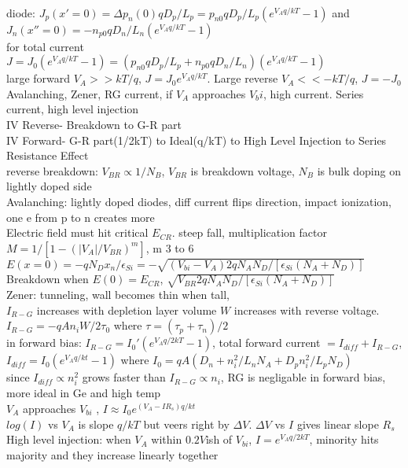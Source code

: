 \documentclass{article}
\begin{document}
\\diode: $J_p(x'=0)=\Delta p_n(0) q D_p/L_p=p_{n0} q D_p/L_p (e^{V_A q/kT}-1)$ and $J_n(x''=0)=-n_{p0} q D_n/L_n (e^{V_A q/kT}-1)$
\\for total current $J=J_0 (e^{V_A q/kT}-1) = (p_{n0} q D_p/L_p+n_{p0} q D_n/L_n)(e^{V_A q/kT}-1)$
\\large forward $V_A>>kT/q$, $J=J_0 e^{V_A q/kT}$. Large reverse $V_A<<-kT/q$, $J=-J_0$
\\Avalanching, Zener, RG current, if $V_A$ approaches $V_bi$, high current. Series current, high level injection
\\IV Reverse- Breakdown to G-R part
\\IV Forward- G-R part(1/2kT) to Ideal(q/kT) to High Level Injection to Series Resistance Effect
\\reverse breakdown: $V_{BR}\propto 1/N_B$, $V_{BR}$ is breakdown voltage, $N_B$ is bulk doping on lightly doped side
\\Avalanching: lightly doped diodes, diff current flips direction, impact ionization, one e from p to n creates more
\\Electric field must hit critical $E_{CR}$. steep fall, multiplication factor $M=1/[1-(|V_A|/V_{BR})^m]$, m 3 to 6
\\$E(x=0)=-q N_D x_n/\epsilon_{Si}=-\sqrt{(V_{bi}-V_A) 2q N_AN_D/[\epsilon_{Si}(N_A+N_D)]}$
\\Breakdown when $E(0)=E_{CR}$, $\sqrt{V_{BR} 2q N_AN_D/[\epsilon_{Si}(N_A+N_D)]}$
\\Zener: tunneling, wall becomes thin when tall, 
\\$I_{R-G}$ increases with depletion layer volume $W$ increases with reverse voltage.
\\$I_{R-G}=-q A n_i W / 2\tau_0$ where $\tau=(\tau_p+\tau_n)/2$
\\in forward bias: $I_{R-G}=I_0'(e^{V_A q/2kT}-1)$, total forward current $= I_{diff}+I_{R-G}$, $I_{diff}=I_0(e^{V_A q/kt}-1)$ where $I_0=qA(D_n+n_i^2/L_nN_A + D_pn_i^2/L_pN_D)$
\\since $I_{diff}\propto n_i^2$ grows faster than $I_{R-G}\propto n_i$, RG is negligable in forward bias, more ideal in Ge and high temp
\\$V_A$ approaches $V_{bi}$ , $I\approx I_0e^{(V_A-IR_s)q/kt}$ 
\\$log(I)$ vs $V_A$ is slope $q/kT$ but veers right by $\Delta V$. $\Delta V$ vs $I$ gives linear slope $R_s$
\\High level injection: when $V_A$ within $0.2V$ish of $V_{bi}$, $I=e^{V_A q/2kT}$, minority hits majority and they increase linearly together
\end{document}

